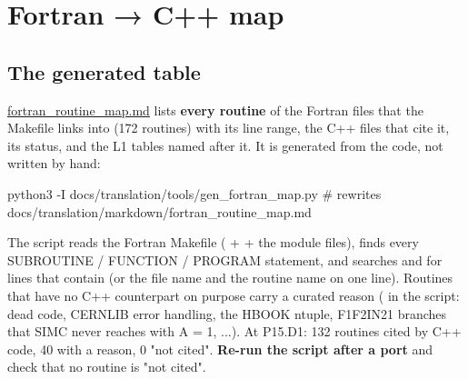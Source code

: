 \chapter{\texorpdfstring{Fortran → C++ map}{Fortran → C++ map}}\label{translation_report-03u5froutineu5fmap}
\section{\texorpdfstring{The generated table}{The generated table}}\label{translation_report-03u5froutineu5fmap:31-the-generated-table}
\hyperref[translation_report-fortranu5froutineu5fmap]{fortran\_\allowbreak{}routine\_\allowbreak{}map.\allowbreak{}md} lists \textbf{every routine} of the Fortran files that the Makefile links
into  (172 routines) with its line range, the C++ files that cite it, its status, and the L1 tables named after
it. It is generated from the code, not written by hand:

\begin{simcshell}[basicstyle=\ttfamily\tiny]
python3 -I docs/translation/tools/gen_fortran_map.py      # rewrites docs/translation/markdown/fortran_routine_map.md
\end{simcshell}
The script reads the Fortran Makefile ( +  + the module files), finds every SUBROUTINE / FUNCTION /
PROGRAM statement, and searches  and  for lines that contain  (or the file name and
the routine name on one line). Routines that have no C++ counterpart on purpose carry a curated reason
( in the script: dead code, CERNLIB error handling, the HBOOK ntuple, F1F2IN21 branches that SIMC never
reaches with A = 1, ...). At P15.D1: 132 routines cited by C++ code, 40 with a reason, 0 "not cited". \textbf{Re-run the
script after a port} and check that no routine is "not cited".

